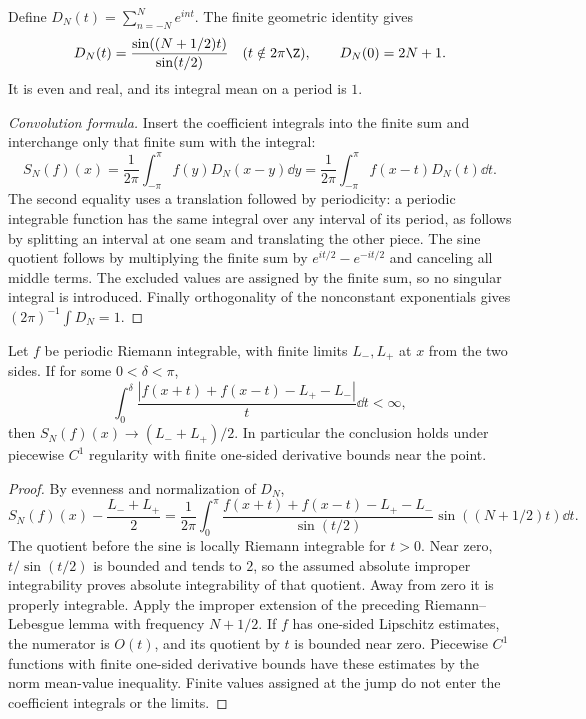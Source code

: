 \begin{construction}
Define $D_N(t)=\sum_{n=-N}^Ne^{int}$. The finite geometric identity gives
\[
 D_N(t)=\frac{\sin((N+1/2)t)}{\sin(t/2)}\quad(t\notin2\pi\Z),
 \qquad D_N(0)=2N+1.
\]
It is even and real, and its integral mean on a period is $1$.
\end{construction}
\begin{proof}[Convolution formula]
Insert the coefficient integrals into the finite sum and interchange only
that finite sum with the integral:
\[
 S_N(f)(x)=\frac1{2\pi}\int_{-\pi}^{\pi}f(y)D_N(x-y)\dd y
 =\frac1{2\pi}\int_{-\pi}^{\pi}f(x-t)D_N(t)\dd t.
\]
The second equality uses a translation followed by periodicity: a periodic
integrable function has the same integral over any interval of its period,
as follows by splitting an interval at one seam and translating the other
piece. The sine quotient follows by multiplying the finite sum by
$e^{it/2}-e^{-it/2}$ and canceling all middle terms. The excluded values
are assigned by the finite sum, so no singular integral is introduced.
Finally orthogonality of the nonconstant exponentials gives
$(2\pi)^{-1}\int D_N=1$.
\end{proof}

\begin{theorem}
Let $f$ be periodic Riemann integrable, with finite limits $L_-,L_+$ at
$x$ from the two sides. If for some $0<\delta<\pi$,
\[
 \int_0^\delta
 \frac{|f(x+t)+f(x-t)-L_+-L_-|}{t}\dd t<\infty,
\]
then $S_N(f)(x)\to(L_-+L_+)/2$.
In particular the conclusion holds under piecewise $C^1$ regularity with
finite one-sided derivative bounds near the point.
\end{theorem}
\begin{proof}
By evenness and normalization of $D_N$,
\[
 S_N(f)(x)-\frac{L_-+L_+}{2}
 =\frac1{2\pi}\int_0^\pi
 \frac{f(x+t)+f(x-t)-L_+-L_-}{\sin(t/2)}
          \sin((N+1/2)t)\dd t.
\]
The quotient before the sine is locally Riemann integrable for $t>0$.
Near zero, $t/\sin(t/2)$ is bounded and tends to $2$, so the assumed
absolute improper integrability proves absolute integrability of that
quotient. Away from zero it is properly integrable. Apply the improper
extension of the preceding Riemann--Lebesgue lemma with frequency
$N+1/2$. If $f$ has one-sided Lipschitz estimates, the numerator is $O(t)$,
and its quotient by $t$ is bounded near zero. Piecewise $C^1$ functions
with finite one-sided derivative bounds have these estimates by the norm
mean-value inequality. Finite values assigned at the jump do not enter
the coefficient integrals or the limits.
\end{proof}

